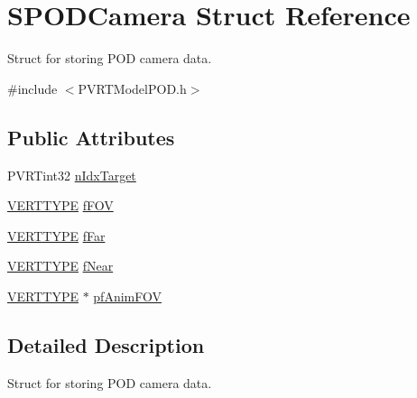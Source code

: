 \hypertarget{struct_s_p_o_d_camera}{\section{S\+P\+O\+D\+Camera Struct Reference}
\label{struct_s_p_o_d_camera}
}


Struct for storing P\+O\+D camera data.  




{\ttfamily \#include $<$P\+V\+R\+T\+Model\+P\+O\+D.\+h$>$}

\subsection*{Public Attributes}
\begin{DoxyCompactItemize}
\item 
P\+V\+R\+Tint32 \hyperlink{struct_s_p_o_d_camera_a83a1f59c9e6227cb63a318f35f28f0c6}{n\+Idx\+Target}
\item 
\hyperlink{group___a_p_i___o_g_l_e_s_ga06da457b7d3e93368ab904f89e1396be}{V\+E\+R\+T\+T\+Y\+P\+E} \hyperlink{struct_s_p_o_d_camera_a9f4b6d0b87a0428fadda754d733fe0bf}{f\+F\+O\+V}
\item 
\hyperlink{group___a_p_i___o_g_l_e_s_ga06da457b7d3e93368ab904f89e1396be}{V\+E\+R\+T\+T\+Y\+P\+E} \hyperlink{struct_s_p_o_d_camera_a110c9dfd95bfbbbc16e9d6beffa1f8d2}{f\+Far}
\item 
\hyperlink{group___a_p_i___o_g_l_e_s_ga06da457b7d3e93368ab904f89e1396be}{V\+E\+R\+T\+T\+Y\+P\+E} \hyperlink{struct_s_p_o_d_camera_ac9bf09d3c1bd4fb4c163dced9ae0bb96}{f\+Near}
\item 
\hyperlink{group___a_p_i___o_g_l_e_s_ga06da457b7d3e93368ab904f89e1396be}{V\+E\+R\+T\+T\+Y\+P\+E} $\ast$ \hyperlink{struct_s_p_o_d_camera_a4f9a9a462f0564b7e03120dd31e027b3}{pf\+Anim\+F\+O\+V}
\end{DoxyCompactItemize}


\subsection{Detailed Description}
Struct for storing P\+O\+D camera data. 



 

